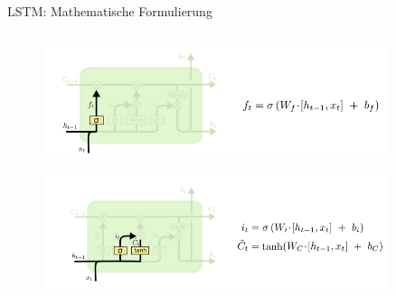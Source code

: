 \documentclass[aspectratio=1610, xcolor=dvipsnames, 9pt]{beamer}
\begin{document}
\begin{frame}{LSTM: Mathematische Formulierung}
\begin{columns}
\begin{column}{0.4\textwidth}
\begin{figure}
               \centering
                           \includegraphics[width=0.9\textwidth]{images/LSTM_3.png}
               \end{figure}
               \begin{figure}
                \centering
                            \includegraphics[width=0.9\textwidth]{images/LSTM_4.png}
                \end{figure}
            

           \end{column}
        \end{columns}
      \end{frame} 
\end{document}

